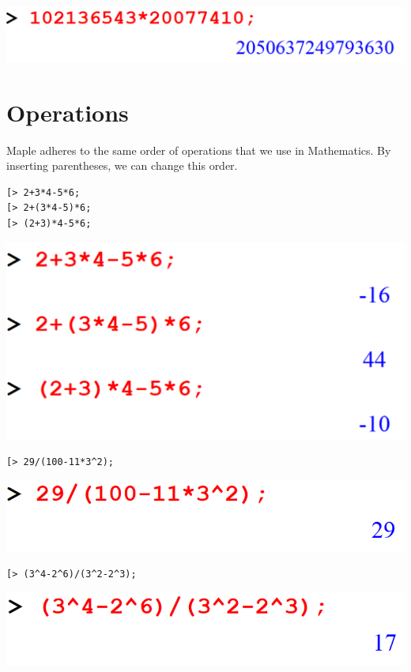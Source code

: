 \documentclass[
]{book}
\theoremstyle{definition}
\theoremstyle{definition}
\theoremstyle{definition}
\theoremstyle{definition}
\theoremstyle{remark}
\begin{document}
\includegraphics{figures/Lesson 1/fig13.png}

\section{Operations}\label{operations-1}

Maple adheres to the same order of operations that we use in Mathematics. By inserting parentheses, we can change this order.

\begin{verbatim}
[> 2+3*4-5*6;
[> 2+(3*4-5)*6;
[> (2+3)*4-5*6;
\end{verbatim}

\includegraphics{figures/Lesson 1/fig14.png}

\begin{verbatim}
[> 29/(100-11*3^2);
\end{verbatim}

\includegraphics{figures/Lesson 1/fig15.png}

\begin{verbatim}
[> (3^4-2^6)/(3^2-2^3);
\end{verbatim}

\includegraphics{figures/Lesson 1/fig16.png}
\end{document}
